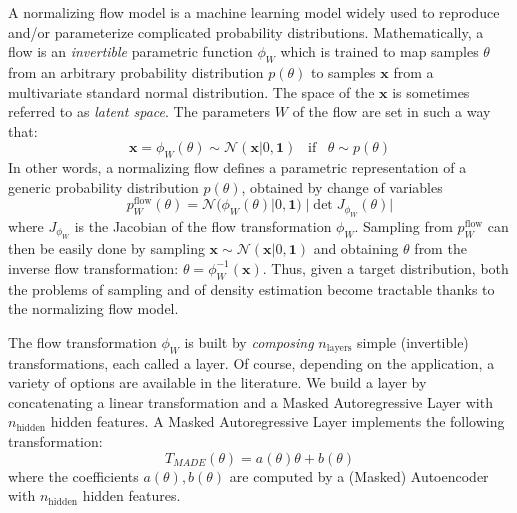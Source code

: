 \documentclass[twocolumn,showpacs,preprintnumbers,nofootinbib,prd,
superscriptaddress,10pt]{revtex4-2}
\begin{document}
A normalizing flow model \cite{norm_flow, nflows_paper, Kobyzev_2021, Papamakarios_thesis} is a machine learning model widely used to reproduce and/or parameterize complicated probability distributions.
Mathematically, a flow is an {\it invertible} parametric function $\phi_W$ which is trained to map samples $\theta$ from an arbitrary probability distribution $p(\theta)$ to samples $\mathbf{x}$ from a multivariate standard normal distribution. The space of the $\mathbf{x}$ is sometimes referred to as {\it latent space}.
The parameters $W$ of the flow are set in such a way that:
\begin{equation}
	\mathbf{x} = \phi_W(\theta) \sim \mathcal{N}(\mathbf{x}|0,\mathbf{1}) \;\;\; \text{if} \;\;\;  \theta \sim p(\theta)
\end{equation}
%
In other words, a normalizing flow defines a parametric representation of a generic probability distribution $p(\theta)$, obtained by change of variables
\begin{equation}\label{eq:p_flow}
	p^\text{flow}_W(\theta) = \mathcal{N}(\phi_W(\theta)|0,\mathbf{1}) \; |\det J_{\phi_W}(\theta)|
\end{equation}
where $J_{\phi_W}$ is the Jacobian of the flow transformation $\phi_W$.
Sampling from $p^\text{flow}_W$ can then be easily done by sampling $\mathbf{x} \sim \mathcal{N}(\mathbf{x}|0,\mathbf{1})$ and obtaining $\theta$ from the inverse flow transformation: $\theta = \phi_W^{-1}(\mathbf{x})$.
Thus, given a target distribution, both the problems of sampling and of density estimation become tractable thanks to the normalizing flow model.

The flow transformation $\phi_W$ is built by {\it composing} $n_\text{layers}$ simple (invertible) transformations, each called a layer. Of course, depending on the application, a variety of options are available in the literature.
We build a layer by concatenating a linear transformation and a Masked Autoregressive Layer \cite{MADE, MAF, MAF_bis} with $n_\text{hidden}$ hidden features.
A Masked Autoregressive Layer implements the following transformation:
\begin{equation}
	T_{MADE}(\theta) = a(\theta)\theta+b(\theta)
\end{equation}
where the coefficients $a(\theta), b(\theta)$ are computed by a (Masked) Autoencoder with $n_\text{hidden}$ hidden features.
\end{document}
